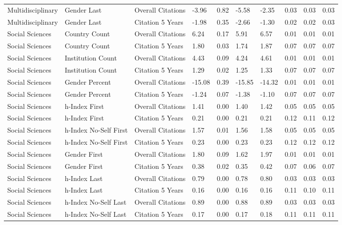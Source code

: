 \documentclass[
  man,floatsintext]{apa6}
\begin{document}
\begin{table}[tbp]
\begin{center}
\begin{threeparttable}
{\begin{tabular}{llllllllll}
Multidisciplinary & Gender Last & Overall Citations & -3.96 & 0.82 & -5.58 & -2.35 & 0.03 & 0.03 & 0.03\\
Multidisciplinary & Gender Last & Citation 5 Years & -1.98 & 0.35 & -2.66 & -1.30 & 0.02 & 0.02 & 0.03\\
Social Sciences & Country Count & Overall Citations & 6.24 & 0.17 & 5.91 & 6.57 & 0.01 & 0.01 & 0.01\\
Social Sciences & Country Count & Citation 5 Years & 1.80 & 0.03 & 1.74 & 1.87 & 0.07 & 0.07 & 0.07\\
Social Sciences & Institution Count & Overall Citations & 4.43 & 0.09 & 4.24 & 4.61 & 0.01 & 0.01 & 0.01\\
Social Sciences & Institution Count & Citation 5 Years & 1.29 & 0.02 & 1.25 & 1.33 & 0.07 & 0.07 & 0.07\\
Social Sciences & Gender Percent & Overall Citations & -15.08 & 0.39 & -15.85 & -14.32 & 0.01 & 0.01 & 0.01\\
Social Sciences & Gender Percent & Citation 5 Years & -1.24 & 0.07 & -1.38 & -1.10 & 0.07 & 0.07 & 0.07\\
Social Sciences & h-Index First & Overall Citations & 1.41 & 0.00 & 1.40 & 1.42 & 0.05 & 0.05 & 0.05\\
Social Sciences & h-Index First & Citation 5 Years & 0.21 & 0.00 & 0.21 & 0.21 & 0.12 & 0.11 & 0.12\\
Social Sciences & h-Index No-Self First & Overall Citations & 1.57 & 0.01 & 1.56 & 1.58 & 0.05 & 0.05 & 0.05\\
Social Sciences & h-Index No-Self First & Citation 5 Years & 0.23 & 0.00 & 0.23 & 0.23 & 0.12 & 0.12 & 0.12\\
Social Sciences & Gender First & Overall Citations & 1.80 & 0.09 & 1.62 & 1.97 & 0.01 & 0.01 & 0.01\\
Social Sciences & Gender First & Citation 5 Years & 0.38 & 0.02 & 0.35 & 0.42 & 0.07 & 0.06 & 0.07\\
Social Sciences & h-Index Last & Overall Citations & 0.79 & 0.00 & 0.78 & 0.80 & 0.03 & 0.03 & 0.03\\
Social Sciences & h-Index Last & Citation 5 Years & 0.16 & 0.00 & 0.16 & 0.16 & 0.11 & 0.10 & 0.11\\
Social Sciences & h-Index No-Self Last & Overall Citations & 0.89 & 0.00 & 0.88 & 0.89 & 0.03 & 0.03 & 0.03\\
Social Sciences & h-Index No-Self Last & Citation 5 Years & 0.17 & 0.00 & 0.17 & 0.18 & 0.11 & 0.11 & 0.11\\

\end{tabular}}
\end{threeparttable}
\end{center}
\end{table}
\end{document}
